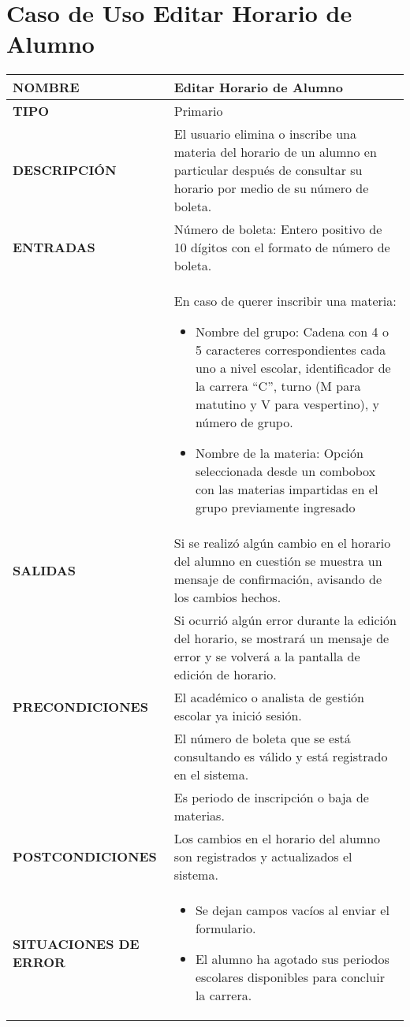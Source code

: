 \newpage
\section{Caso de Uso Editar Horario de Alumno}
\begin{longtable}{ | p{6cm} | p{10cm} |}
\hline
\textbf{NOMBRE} & Editar Horario de Alumno\\
\hline
\textbf{TIPO} & Primario\\
\hline
\textbf{DESCRIPCIÓN} & El usuario elimina o inscribe una materia del horario de un alumno en particular después de consultar su horario por medio de su número de boleta.\\
\hline
\textbf{ENTRADAS} & Número de boleta: Entero positivo de 10 dígitos con el formato de número de boleta.\\ & En caso de querer inscribir una materia:\begin{itemize}
    \item Nombre del grupo: Cadena con 4 o 5 caracteres correspondientes cada uno a nivel escolar, identificador de la carrera “C”, turno (M para matutino y V para vespertino), y número de grupo. 
    \item Nombre de la materia: Opción seleccionada desde un combobox con las materias impartidas en el grupo previamente ingresado
\end{itemize}\\
\hline
\textbf{SALIDAS} & Si se realizó algún cambio en el horario del alumno en cuestión se muestra un mensaje de confirmación, avisando de los cambios hechos.\\ & Si ocurrió algún error durante la edición del horario, se mostrará un mensaje de error y se volverá a la pantalla de edición de horario.\\
\hline
\textbf{PRECONDICIONES} & El académico o analista de gestión escolar ya inició sesión.\\ & El número de boleta que se está consultando es válido y está registrado en el sistema.\\ & Es periodo de inscripción o baja de materias.\\
\hline
\textbf{POSTCONDICIONES} & Los cambios en el horario del alumno son registrados y actualizados el sistema.\\
\hline
\textbf{SITUACIONES DE ERROR} & \begin{itemize}
    \item Se dejan campos vacíos al enviar el formulario.
    \item El alumno ha agotado sus periodos escolares disponibles para concluir la carrera.

\end{itemize}
\end{longtable}
